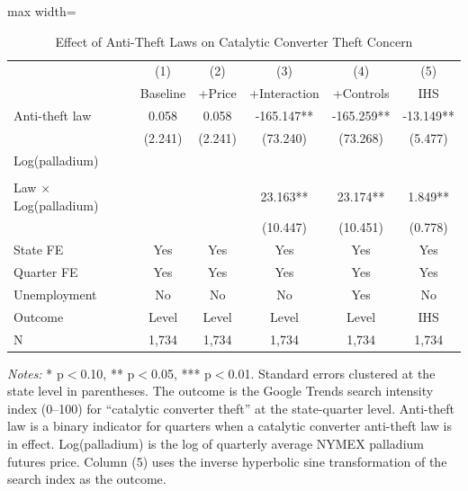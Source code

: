 \begin{table}[H]
\centering
\caption{Effect of Anti-Theft Laws on Catalytic Converter Theft Concern}
\begin{threeparttable}
\begin{adjustbox}{max width=\textwidth}
\begin{tabular}{lccccc}
\toprule
& (1) & (2) & (3) & (4) & (5) \\
& Baseline & +Price & +Interaction & +Controls & IHS \\
\midrule
Anti-theft law & 0.058 & 0.058 & -165.147** & -165.259** & -13.149** \\
& (2.241) & (2.241) & (73.240) & (73.268) & (5.477) \\[6pt]
Log(palladium) & & & & & \\
& & & & & \\[6pt]
Law $\times$ Log(palladium) & & & 23.163** & 23.174** & 1.849** \\
& & & (10.447) & (10.451) & (0.778) \\[6pt]
\midrule
State FE & Yes & Yes & Yes & Yes & Yes \\
Quarter FE & Yes & Yes & Yes & Yes & Yes \\
Unemployment & No & No & No & Yes & No \\
Outcome & Level & Level & Level & Level & IHS \\
N & 1,734 & 1,734 & 1,734 & 1,734 & 1,734 \\
\bottomrule
\end{tabular}
\end{adjustbox}
\begin{tablenotes}[flushleft]
\small
\item \textit{Notes:} * p$<$0.10, ** p$<$0.05, *** p$<$0.01. Standard errors clustered at the state level in parentheses. The outcome is the Google Trends search intensity index (0--100) for ``catalytic converter theft'' at the state-quarter level. Anti-theft law is a binary indicator for quarters when a catalytic converter anti-theft law is in effect. Log(palladium) is the log of quarterly average NYMEX palladium futures price. Column (5) uses the inverse hyperbolic sine transformation of the search index as the outcome.
\end{tablenotes}
\end{threeparttable}
\label{tab:main}
\end{table}
